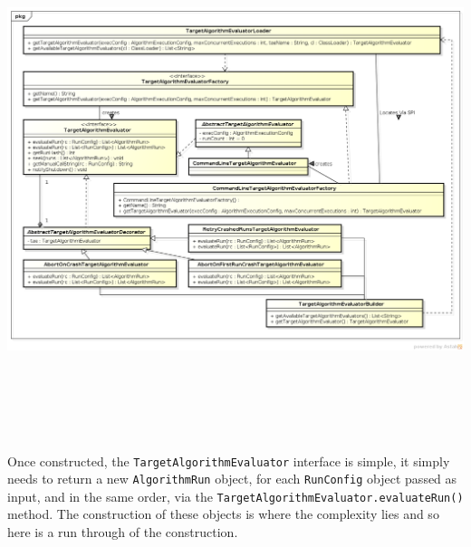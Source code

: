 \documentclass[manual.tex]{subfiles}
\begin{document}
\includegraphics[height=15cm,angle=270, trim=4cm 0cm 0cm 0cm clip=true]{tae.png} 

\vspace{15pt}
Once constructed, the \texttt{TargetAlgorithmEvaluator} interface is simple, it simply needs to return a new \texttt{AlgorithmRun} object, for each \texttt{RunConfig} object passed as input, and in the same order, via the \texttt{TargetAlgorithmEvaluator.evaluateRun()} method. The construction of these objects is where the complexity lies and so here is a run through of the construction.
\end{document}
